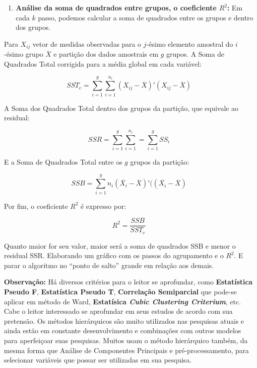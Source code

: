 \documentclass[
]{book}
\providecommand{\tightlist}{%
  \setlength{\itemsep}{0pt}\setlength{\parskip}{0pt}}
\begin{document}
\begin{enumerate}
\def\labelenumi{\arabic{enumi}.}
\setcounter{enumi}{2}
\tightlist
\item
  \textbf{Análise da soma de quadrados entre grupos, o coeficiente \(R^2\):} Em cada \(k\) passo, podemos calcular a soma de quadrados entre os grupos e dentro dos grupos.
\end{enumerate}

Para \(X_{ij}\) vetor de medidas observadas para o \(j\)-ésimo elemento amostral do \(i\)-ésimo grupo \(\overline{X}\) e partição dos dados amostrais em \(g\) grupos. A Soma de Quadrados Total corrigida para a média global em cada variável:

\begin{equation}
SST_c=\displaystyle \sum^{g}_{i=1} \sum^{n_i}_{i=1} (X_{ij}-\overline{X})'(X_{ij}-\overline{X})
 \label{eq:sstc}
\end{equation}

A Soma dos Quadrados Total dentro dos grupos da partição, que equivale ao residual:

\begin{equation}
SSR=\displaystyle \sum^{g}_{i=1} \sum^{n_i}_{i=1} = \sum^{g}_{i=1}SS_i
 \label{eq:ssrc}
\end{equation}

E a Soma de Quadrados Total entre os \(g\) grupos da partição:

\begin{equation}
SSB=\displaystyle \sum^{g}_{i=1} n_i (\overline{X_{i}}-\overline{X})'((\overline{X_{i}}-\overline{X})
 \label{eq:ssbc}
\end{equation}

Por fim, o coeficiente \(R^2\) é expresso por:

\begin{equation}
R^2=\frac{SSB}{SST_c}
 \label{eq:rsquarec}
\end{equation}

Quanto maior for seu valor, maior será a soma de quadrados SSB e menor o residual SSR. Elaborando um gráfico com os passos do agrupamento e o \(R^2\). E parar o algoritmo no ``ponto de salto'' grande em relação aos demais.

\textbf{Observação:} Há diversos critérios para o leitor se aprofundar, como \textbf{Estatística Pseudo F}, \textbf{Estatística Pseudo T}, \textbf{Correlação Semiparcial} que pode-se aplicar em método de Ward, \textbf{Estatísica \emph{Cubic Clustering Criterium}}, etc. Cabe o leitor interessado se aprofundar em seus estudos de acordo com sua pretensão. Os métodos hierárquicos são muito utilizados nas pesquisas atuais e ainda estão em constante desenvolvimento e combinações com outros modelos para aperfeiçoar suas pesquisas. Muitos usam o método hierárquico também, da mesma forma que Análise de Componentes Principais e pré-processamento, para selecionar variáveis que possar ser utilizadas em sua pesquisa.
\end{document}

